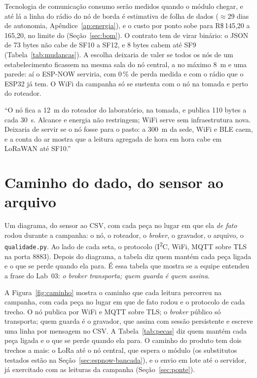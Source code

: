 \begin{decisao}{Tecnologia de comunicação}
{  consumo serão medidos quando o módulo chegar, e até lá a linha do rádio
  do nó de borda é estimativa de folha de dados ($\approx$29 dias de
  autonomia, Apêndice~\ref{ap:energia}), e o custo por ponto sobe para
  R\$\,145,20 a 165,20, no limite do  (Seção~\ref{sec:bom}). O
  contrato tem de virar binário:
  o JSON de 73 bytes não cabe de SF10 a SF12, e 8 bytes cabem até SF9
  (Tabela~\ref{tab:mudancas}). A escolha deixaria de valer se todos os
  nós de um estabelecimento ficassem na mesma sala do nó central, a no
  máximo \SI{8}{\metre} e uma parede: aí o ESP-NOW serviria, com 0\,\% de
  perda medida e com o rádio que o ESP32 já tem. O WiFi da campanha só se
  sustenta com o nó na tomada e perto do roteador.}
\end{decisao}

\begin{exemploguia}
\enquote{O nó fica a \SI{12}{\metre} do roteador do laboratório, na
tomada, e publica \SI{110}{} bytes a cada \SI{30}{\second}. Alcance e
energia não restringem; WiFi serve sem infraestrutura nova. Deixaria de
servir se o nó fosse para o pasto: a \SI{300}{\metre} da sede, WiFi e BLE
caem, e a conta do ar mostra que a leitura agregada de hora em hora
cabe em LoRaWAN até SF10.}
\end{exemploguia}

\section{Caminho do dado, do sensor ao arquivo}
\label{sec:caminho}
\rubricaFuncionalidade

\begin{orientacao}
Um diagrama, do sensor ao CSV, com cada peça no lugar em que ela
\emph{de fato} rodou durante a campanha: o nó, o roteador, o
\emph{broker}, o gravador, o arquivo, o \texttt{qualidade.py}. Ao lado
de cada seta, o protocolo (I\textsuperscript{2}C, WiFi, MQTT sobre TLS na
porta 8883). Depois do diagrama, a tabela diz quem mantém cada peça
ligada e o que se perde quando ela para. É essa tabela que mostra se a
equipe entendeu a frase do Lab~03: \emph{o broker transporta; quem
guarda é quem assina}.
\end{orientacao}

A Figura~\ref{fig:caminho} mostra o caminho que cada leitura percorreu na
campanha, com cada peça no lugar em que de fato rodou e o protocolo de
cada trecho. O nó publica por WiFi e MQTT sobre TLS; o \emph{broker}
público só transporta; quem guarda é o gravador, que assina com sessão
persistente e escreve uma linha por mensagem no CSV. A
Tabela~\ref{tab:pecas} diz quem mantém cada peça ligada e o que se perde
quando ela para. O caminho do produto tem dois trechos a mais: o LoRa
até o nó central, que espera o módulo (os substitutos testados estão na
Seção~\ref{sec:espnow-bancada}), e o envio em lote até o servidor, já
exercitado com as leituras da campanha (Seção~\ref{sec:ponte}).


